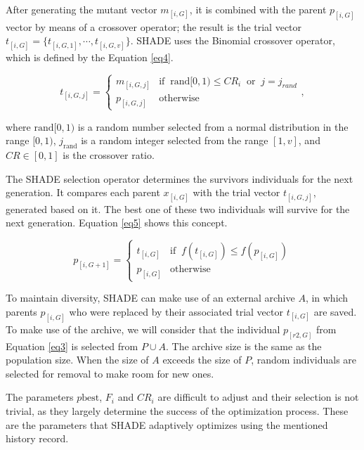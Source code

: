 \documentclass[review]{elsarticle}
\begin{document}
After generating the mutant vector $m_{[i,G]}$, it is combined with the parent $p_{[i,G]}$ vector by means of a crossover operator; the result is the trial vector $t_{[i,G]} = \{t_{[i,G,1]}, \cdots, t_{[i,G,v]}\}$. SHADE uses the Binomial crossover operator, which is defined by the Equation \eqref{eq4}.

\begin{equation}
t_{[i,G,j]} = \left\{ \begin{array}{lc}
m_{[i,G,j]} &   \text{if} \;\; \text{rand}[0,1) \le CR_i \;\; \text{or} \;\;j = j_{rand} \\
p_{[i,G,j]} &  \text{otherwise}
\end{array}
\right.,
\label{eq4}
\end{equation}

\noindent where $\text{rand}[0,1)$ is a random number selected from a normal distribution in the range $[0,1)$, $j_\text{rand}$ is a random integer selected from the range $[1,v]$, and $CR \in [0,1]$ is the crossover ratio.

The SHADE selection operator determines the survivors individuals for the next generation. It compares each parent $x_{[i,G]}$ with the trial vector $t_{[i,G,j]}$, generated based on it. The best one of these two individuals will survive for the next generation. Equation \eqref{eq5} shows this concept.

\begin{equation}
p_{[i,G + 1]} = \left\{ \begin{array}{lc}
t_{[i,G]} &   \text{if} \;\; f(t_{[i,G]}) \le f(p_{[i,G]}) \\
p_{[i,G]} &  \text{otherwise}
\end{array}
\right.
\label{eq5}
\end{equation}

To maintain diversity, SHADE can make use of an external archive $A$, in which parents $p_{[i,G]}$ who were replaced by their associated trial vector $t_{[i,G]}$ are saved. To make use of the archive, we will consider that the individual $p_{[r2,G]}$ from Equation \eqref{eq3} is selected from $P \cup A$. The archive size is the same as the population size. When the size of $A$ exceeds the size of $P$, random individuals are selected for removal to make room for new ones.

The parameters $p\text{best}$, $F_i$ and $CR_i$ are difficult to adjust and their selection is not trivial, as they largely determine the success of the optimization process. These are the parameters that SHADE adaptively optimizes using the mentioned history record.
\end{document}
